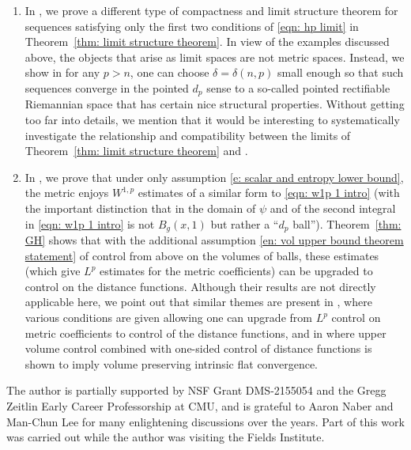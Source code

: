 \documentclass[11pt,reqno]{amsart}
\theoremstyle{remark}
\theoremstyle{definition}
\numberwithin{equation}{section}
\begin{document}
\begin{enumerate}
\item In \cite[Theorem 1.15]{LNN1}, we prove a different type of compactness and limit structure theorem for sequences satisfying only the first two conditions of \eqref{eqn: hp limit} in Theorem~\ref{thm: limit structure theorem}.  In view of the examples discussed above, the objects that arise as limit spaces are not metric spaces. Instead, we show in \cite{LNN1} for any $p>n$, one can choose $\delta=\delta(n,p)$ small enough so that such sequences converge in the pointed $d_p$ sense to a so-called pointed rectifiable Riemannian space 
 that has certain nice structural properties. Without getting too far into details, we mention  that
 it would be interesting to systematically investigate the relationship and compatibility between the limits of Theorem~\ref{thm: limit structure theorem} and \cite[Theorem 1.15]{LNN1}.


\item In \cite[Theorem 1.11]{LNN1}, we prove that under only assumption \eqref{e: scalar and entropy lower bound}, the metric enjoys $W^{1,p}$ estimates of a similar form to \eqref{eqn: w1p 1 intro} (with the important distinction that in \cite{LNN1} the domain of $\psi$ and of the second integral in \eqref{eqn: w1p 1 intro} is not $B_g(x,1)$ but rather a ``$d_p$ ball''). Theorem~\ref{thm: GH} shows  that with the additional assumption \eqref{en: vol upper bound theorem statement} of control from above on the volumes of balls, these estimates (which give $L^p$ estimates for the metric coefficients) can be upgraded to control on the distance functions. Although their results are not directly applicable here, we point out that similar themes are present in \cite{AllenSormani, BrianAllen}, where various conditions are given allowing one can upgrade from $L^p$ control on metric coefficients to control of the distance functions, and in \cite{APS} where upper volume control combined with one-sided control of distance functions is shown to imply volume preserving intrinsic flat convergence.


\end{enumerate}



 The author is partially supported by NSF Grant DMS-2155054 and the Gregg Zeitlin Early Career Professorship at CMU, and is grateful to Aaron Naber and Man-Chun Lee for many enlightening discussions over the years. Part of this work was carried out while the author was visiting the Fields Institute.
\end{document}
